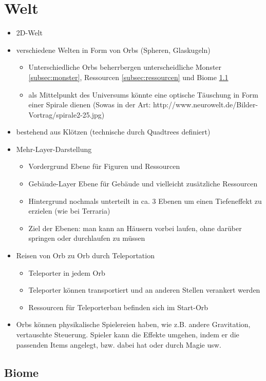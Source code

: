 \section{Welt}
\label{sec:welt}
	\begin{itemize}
		\item 2D-Welt
		\item verschiedene Welten in Form von Orbs (Spheren, Glaskugeln)
		\begin{itemize}
			\item Unterschiedliche Orbs beherrbergen unterscheidliche Monster \ref{subsec:monster}, Ressourcen \ref{subsec:ressourcen} und Biome \ref{subsec:biome}
			\item als Mittelpunkt des Universums könnte eine optische Täuschung in Form einer Spirale dienen (Sowas in der Art: http://www.neurowelt.de/Bilder-Vortrag/spirale2-25.jpg)
		\end{itemize}
		\item bestehend aus Klötzen (technische durch Quadtrees definiert)
		\item Mehr-Layer-Darstellung
		\begin{itemize}
			\item Vordergrund
				\subitem Ebene für Figuren und Ressourcen
			\item Gebäude-Layer
				\subitem Ebene für Gebäude und vielleicht zusätzliche Ressourcen
			\item Hintergrund
				\subitem nochmals unterteilt in ca. 3 Ebenen um einen Tiefeneffekt zu erzielen (wie bei Terraria)
			\item Ziel der Ebenen: man kann an Häusern vorbei laufen, ohne darüber springen oder durchlaufen zu müssen
		\end{itemize}
		\item Reisen von Orb zu Orb durch Teleportation
		\begin{itemize}
			\item Teleporter in jedem Orb
			\item Teleporter können transportiert und an anderen Stellen verankert werden
			\item Ressourcen für Teleporterbau befinden sich im Start-Orb
		\end{itemize}
		\item Orbs können physikalische Spielereien haben, wie z.B. andere Gravitation, vertauschte Steuerung. Spieler kann die Effekte umgehen, indem er die passenden Items angelegt, bzw. dabei hat oder durch Magie usw.
	\end{itemize}

\subsection{Biome}
\label{subsec:biome}
